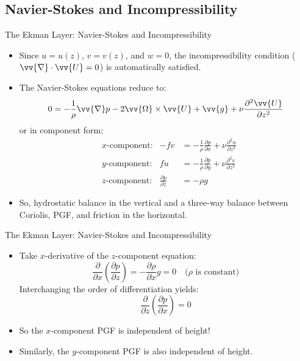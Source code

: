 \subsection{Navier-Stokes and Incompressibility}
\begin{frame}{The Ekman Layer: Navier-Stokes and Incompressibility}

\begin{itemize}
	\item Since $u=u(z)$, $v=v(z)$, and $w=0$, the incompressibility condition ($\vv{\nabla} \cdot \vv{U}=0$) is automatically satisfied.
	\item The Navier-Stokes equations reduce to:
	$$0 = -\frac{1}{\rho}\vv{\nabla}p - 2\vv{\Omega} \times \vv{U} + \vv{g} + \nu \frac{\partial^2 \vv{U}}{\partial z^2}$$
	or in component form:
	\begin{align*}
	&\text{$x$-component:}& -fv &= -\frac{1}{\rho}\frac{\partial p}{\partial x} + 	\nu \frac{\partial^2 u}{\partial z^2}\\
	&\text{$y$-component:}& fu &= -\frac{1}{\rho}\frac{\partial p}{\partial y} + 	\nu \frac{\partial^2 v}{\partial z^2}\\
	&\text{$z$-component:}& \frac{\partial p}{\partial z} &= -\rho g
	\end{align*}
	\item So, hydrostatic balance in the vertical and a three-way balance between Coriolis, PGF, and friction in the horizontal.
\end{itemize}
\end{frame}
\begin{frame}{The Ekman Layer: Navier-Stokes and Incompressibility}

\begin{itemize}
	\item Take $x$-derivative of the $z$-component equation:
	$$\frac{\partial}{\partial x}\left(\frac{\partial p}{\partial z}\right) = -\frac{\partial \rho}{\partial x}g = 0 \quad \text{($\rho$ is constant)}$$
	Interchanging the order of differentiation yields:
	$$\frac{\partial}{\partial z}\left(\frac{\partial p}{\partial x}\right) = 0$$
	\item So the $x$-component PGF is independent of height!
	\item Similarly, the $y$-component PGF is also independent of height.
\end{itemize}
\end{frame}
